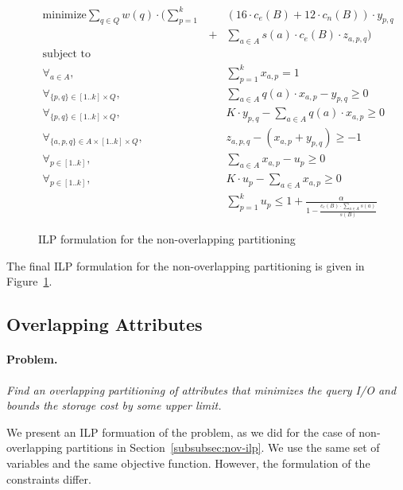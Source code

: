 \begin{figure}[!t]
\begin{eqnarray}
\text{minimize}  
    \sum_{q\in Q} w(q)\cdot \Big(\sum_{p=1}^{k} \!\!&&\!\! (16\cdot c_e(B) + 12\cdot c_n(B))\cdot y_{p,q}\nonumber\\
    &+& \sum_{a\in A} s(a)\cdot c_e(B)\cdot z_{a,p,q} \Big) \nonumber\\
\text{subject to}&&\nonumber\\
\forall_{a\in A}, 
    && \sum_{p=1}^{k} x_{a,p} = 1\nonumber\\
\forall_{\{p,q\}\in [1..k]\times Q}, 
    &&  \sum_{a\in A} q(a)\cdot x_{a,p} - y_{p,q} \geq 0 \nonumber\\
\forall_{\{p,q\}\in [1..k]\times Q}, 
    &&  K\cdot y_{p,q} - \sum_{a\in A} q(a)\cdot x_{a,p}  \geq 0 \nonumber\\
\forall_{\{a,p,q\}\in A\times [1..k]\times Q},
    && z_{a,p,q} - (x_{a,p} + y_{p,q}) \geq -1\nonumber\\
\forall_{p\in[1..k]},
    && \sum_{a\in A} x_{a,p} - u_p \geq 0 \nonumber\\
\forall_{p\in[1..k]},
    && K\cdot u_p - \sum_{a\in A} x_{a,p} \geq 0 \nonumber\\    
&& \sum_{p=1}^{k} u_p \leq 1 + \frac{\alpha}
  {1-\frac{c_e(B)\cdot \sum_{a\in A} s(a)}{s(B)}} \nonumber
\end{eqnarray}
\caption{ILP formulation for the non-overlapping partitioning}
\label{fig:nov-ilp}
\end{figure}

The final ILP formulation for the non-overlapping partitioning is given in
Figure~\ref{fig:nov-ilp}.


\subsection{Overlapping Attributes}\label{subsubsec:ov-ilp}

\paragraph*{Problem.$\,$} \emph{Find an overlapping partitioning of attributes
that minimizes the query I/O and bounds the storage cost by some upper
limit.}

We present an ILP formuation of the problem, as we did for the case of
non-overlapping partitions in Section~\ref{subsubsec:nov-ilp}. We use the same
set of variables and the same objective function. However, the formulation of
the constraints differ. 

